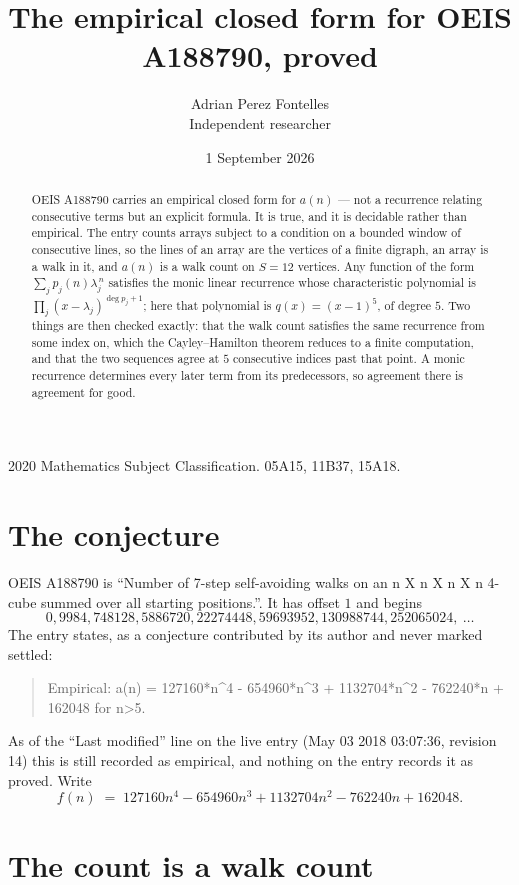 \documentclass[11pt,a4paper]{article}
\title{The empirical closed form for OEIS A188790, proved}
\author{Adrian Perez Fontelles\\ \small Independent researcher}
\date{1 September 2026}
\theoremstyle{plain}
\theoremstyle{definition}
\begin{document}
\maketitle

\begin{abstract}
OEIS A188790 carries an empirical closed form for $a(n)$ --- not a recurrence relating
consecutive terms but an explicit formula. It is true, and it is decidable rather than
empirical. The entry counts arrays subject to a condition on a bounded window of consecutive lines, so the lines of an array are the
vertices of a finite digraph, an array is a walk in it, and $a(n)$ is a walk count on
$S=12$ vertices. Any function of the form $\sum_j p_j(n)\lambda_j^{\,n}$ satisfies the
monic linear recurrence whose characteristic polynomial is
$\prod_j(x-\lambda_j)^{\deg p_j+1}$; here that polynomial is $q(x)=(x-1)^{5}$, of degree
$5$. Two things are then checked exactly: that the walk count satisfies the same
recurrence from some index on, which the Cayley--Hamilton theorem reduces to a finite
computation, and that the two sequences agree at $5$ consecutive indices past that
point. A monic recurrence determines every later term from its predecessors, so agreement
there is agreement for good.
\end{abstract}

\noindent\small 2020 Mathematics Subject Classification. 05A15, 11B37, 15A18.\normalsize

\section{The conjecture}

OEIS A188790 is ``Number of 7-step self-avoiding walks on an n X n X n X n 4-cube summed over all starting positions.''. It has offset $1$ and begins
\[
0, 9984, 748128, 5886720, 22274448, 59693952, 130988744, 252065024,\ \dots
\]
The entry states, as a conjecture contributed by its author and never marked settled:
\begin{quote}
Empirical: a(n) = 127160*n\^{}4 - 654960*n\^{}3 + 1132704*n\^{}2 - 762240*n + 162048 for n>5.
\end{quote}
As of the ``Last modified'' line on the live entry (May 03 2018 03:07:36, revision 14) this is still
recorded as empirical, and nothing on the entry records it as proved. Write
\[
f(n)\;=\;127160 n^{4} - 654960 n^{3} + 1132704 n^{2} - 762240 n + 162048.
\]

\section{The count is a walk count}
\end{document}
